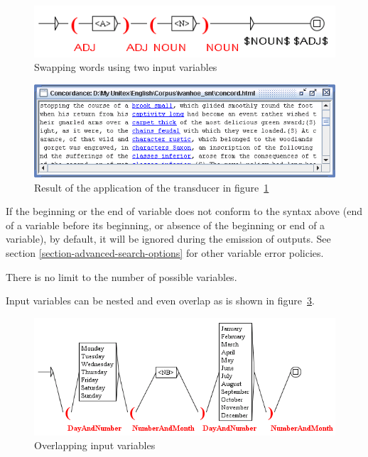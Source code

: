 \begin{figure}[!ht]
\begin{center}
\includegraphics[width=11.3cm]{resources/img/fig6-27.png}
\caption{Swapping words using two input variables\label{fig-swapping-words}}
\end{center}
\end{figure}

\begin{figure}[!ht]
\begin{center}
\includegraphics[width=13.4cm]{resources/img/fig6-28.png}
\caption{Result of the application of the transducer in 
figure~\ref{fig-swapping-words}\label{fig-no-space-problem}}
\end{center}
\end{figure}

\bigskip
\noindent If the beginning or the end of variable does not conform to the syntax above (end of a variable before
its beginning, or absence of the beginning or end of a variable), by default, it
will be ignored during the emission of outputs. See section
\ref{section-advanced-search-options} for other variable error policies.

\bigskip
\noindent There is no limit to the number of possible variables.

\bigskip
\noindent Input variables can be nested and even overlap as is shown in
figure~\ref{fig-overlapping-variables}.

\begin{figure}[!ht]
\begin{center}
\includegraphics[width=15cm]{resources/img/fig6-29.png}
\caption{Overlapping input variables\label{fig-overlapping-variables}}
\end{center}
\end{figure}

